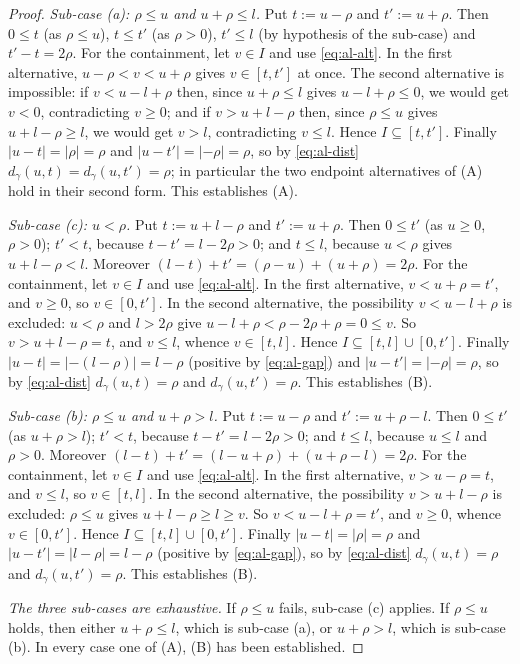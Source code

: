 \begin{proof}
  \emph{Sub-case (a): $\rho \leq u$ and $u + \rho \leq l$.} Put $t := u-\rho$ and $t' := u+\rho$.
  Then $0 \leq t$ (as $\rho \leq u$), $t \leq t'$ (as $\rho>0$), $t' \leq l$ (by hypothesis of the
  sub-case) and $t'-t = 2\rho$. For the containment, let $v \in I$ and use \eqref{eq:al-alt}. In
  the first alternative, $u-\rho < v < u+\rho$ gives $v \in [t,t']$ at once. The second
  alternative is impossible: if $v < u-l+\rho$ then, since $u + \rho \leq l$ gives $u-l+\rho \leq
  0$, we would get $v < 0$, contradicting $v \geq 0$; and if $v > u+l-\rho$ then, since $\rho \leq
  u$ gives $u+l-\rho \geq l$, we would get $v > l$, contradicting $v \leq l$. Hence $I \subseteq
  [t,t']$. Finally $|u-t| = |{\rho}| = \rho$ and $|u-t'| = |-\rho| = \rho$, so by
  \eqref{eq:al-dist} $d_\gamma(u,t) = d_\gamma(u,t') = \rho$; in particular the two endpoint
  alternatives of (A) hold in their second form. This establishes (A).

  \emph{Sub-case (c): $u < \rho$.} Put $t := u + l - \rho$ and $t' := u+\rho$. Then $0 \leq t'$ (as
  $u \geq 0$, $\rho>0$); $t' < t$, because $t - t' = l - 2\rho > 0$; and $t \leq l$, because $u <
  \rho$ gives $u + l - \rho < l$. Moreover $(l-t) + t' = (\rho - u) + (u+\rho) = 2\rho$. For the
  containment, let $v \in I$ and use \eqref{eq:al-alt}. In the first alternative, $v < u + \rho =
  t'$, and $v \geq 0$, so $v \in [0,t']$. In the second alternative, the possibility $v < u-l+\rho$
  is excluded: $u<\rho$ and $l > 2\rho$ give $u - l + \rho < \rho - 2\rho + \rho = 0 \leq v$. So
  $v > u+l-\rho = t$, and $v \leq l$, whence $v \in [t,l]$. Hence $I \subseteq [t,l]\cup[0,t']$.
  Finally $|u - t| = |{-(l-\rho)}| = l-\rho$ (positive by \eqref{eq:al-gap}) and $|u-t'| = |-\rho|
  = \rho$, so by \eqref{eq:al-dist} $d_\gamma(u,t) = \rho$ and $d_\gamma(u,t') = \rho$. This
  establishes (B).

  \emph{Sub-case (b): $\rho \leq u$ and $u+\rho > l$.} Put $t := u-\rho$ and $t' := u+\rho-l$. Then
  $0 \leq t'$ (as $u+\rho > l$); $t' < t$, because $t - t' = l - 2\rho > 0$; and $t \leq l$,
  because $u \leq l$ and $\rho>0$. Moreover $(l-t)+t' = (l-u+\rho) + (u+\rho-l) = 2\rho$. For the
  containment, let $v \in I$ and use \eqref{eq:al-alt}. In the first alternative, $v > u-\rho = t$,
  and $v \leq l$, so $v \in [t,l]$. In the second alternative, the possibility $v > u+l-\rho$ is
  excluded: $\rho \leq u$ gives $u+l-\rho \geq l \geq v$. So $v < u-l+\rho = t'$, and $v \geq 0$,
  whence $v \in [0,t']$. Hence $I \subseteq [t,l]\cup[0,t']$. Finally $|u-t| = |{\rho}| = \rho$ and
  $|u-t'| = |l-\rho| = l-\rho$ (positive by \eqref{eq:al-gap}), so by \eqref{eq:al-dist}
  $d_\gamma(u,t) = \rho$ and $d_\gamma(u,t') = \rho$. This establishes (B).

  \emph{The three sub-cases are exhaustive.} If $\rho \leq u$ fails, sub-case (c) applies. If $\rho
  \leq u$ holds, then either $u+\rho \leq l$, which is sub-case (a), or $u + \rho > l$, which is
  sub-case (b). In every case one of (A), (B) has been established. \qedhere
\end{proof}
